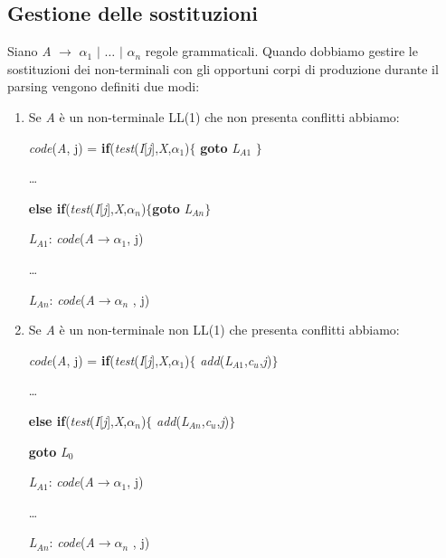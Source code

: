\subsection{Gestione delle sostituzioni}
Siano \textit{A} $\to$ $\alpha_1$ $\mid$ $\dots$ $\mid$ $\alpha_{n}$ regole grammaticali. Quando dobbiamo gestire le sostituzioni dei non-terminali con gli opportuni corpi di produzione durante il parsing vengono definiti due modi:
\begin{enumerate}
	\item Se \textit{A} è un non-terminale LL(1) che non presenta conflitti abbiamo:\par
	\hspace{2.5cm}\textit{code}(\textit{A}, j) = \hspace{2cm}\textbf{if}(\textit{test}(\textit{I}[\textit{j}],\textit{X},$\alpha_1$)$\{$ \textbf{goto} \textit{L}$_{A1}$ $\}$ \par 
	\hspace{6.8cm} \dots \par
	\hspace{6.8cm} \textbf{else if}(\textit{test}(\textit{I}[\textit{j}],\textit{X},$\alpha_n$)$\{$\textbf{goto} \textit{L}$_{An}$$\}$ \par 
	\hspace{6.2cm} \textit{L}$_{A1}$: \textit{code}(\textit{A}$\to$$\alpha_1$, j) \par 
	\hspace{6.2cm} \dots \par 
	\hspace{6.2cm} \textit{L}$_{An}$: \textit{code}(\textit{A}$\to$$\alpha_{n}$ , j) \par 
	\item Se \textit{A} è un non-terminale non LL(1) che presenta conflitti abbiamo:\par
	\hspace{2.5cm}\textit{code}(\textit{A}, j) = \hspace{2cm}\textbf{if}(\textit{test}(\textit{I}[\textit{j}],\textit{X},$\alpha_1$)$\{$ \textit{add}(\textit{L}$_{A1}$,\textit{c}$_u$,\textit{j})$\}$ \par 
	\hspace{6.8cm} \dots \par
	\hspace{6.8cm} \textbf{else if}(\textit{test}(\textit{I}[\textit{j}],\textit{X},$\alpha_n$)$\{$ \textit{add}(\textit{L}$_{An}$,\textit{c}$_u$,\textit{j})$\}$ \par 
	\hspace{6.8cm}\textbf{goto} \textit{L}$_0$ \par 
	\hspace{6.2cm} \textit{L}$_{A1}$: \textit{code}(\textit{A}$\to$$\alpha_1$, j) \par 
	\hspace{6.2cm} \dots \par 
	\hspace{6.2cm} \textit{L}$_{An}$: \textit{code}(\textit{A}$\to$$\alpha_{n}$ , j) \par 
\end{enumerate}
